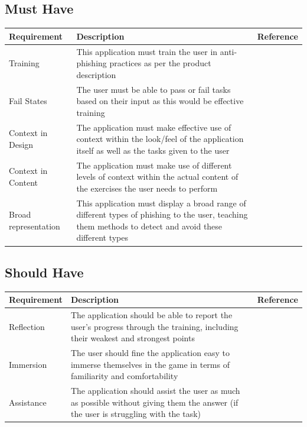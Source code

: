 \documentclass{l4proj}
\begin{document}
\subsection{Must Have}
\begin{tabular}{ | m{10em} | m{25em}| m{5em} | } 
  \hline
  \textbf{Requirement} & \textbf{Description} & \textbf{Reference} \\ 
  \hline
  Training & This application must train the user in anti-phishing practices as per the product description &  \\ 
  \hline
  Fail States & The user must be able to pass or fail tasks based on their input as this would be effective training &  \\ 
  \hline
  Context in Design & The application must make effective use of context within the look/feel of the application itself as well as the tasks given to the user &  \\  
  \hline
  Context in Content & The application must make use of different levels of context within the actual content of the exercises the user needs to perform &  \\  
  \hline
  Broad representation & This application must display a broad range of different types of phishing to the user, teaching them methods to detect and avoid these different types &  \\  
  \hline
\end{tabular}

\subsection{Should Have}
\begin{tabular}{ | m{10em} | m{25em}| m{5em} | } 
  \hline
  \textbf{Requirement} & \textbf{Description} & \textbf{Reference} \\ 
  \hline
  Reflection & The application should be able to report the user’s progress through the training, including their weakest and strongest points &  \\ 
  \hline
  Immersion & The user should fine the application easy to immerse themselves in the game in terms of familiarity and comfortability  &  \\ 
  \hline
  Assistance & The application should assist the user as much as possible without giving them the answer (if the user is struggling with the task) &  \\ 
  \hline
\end{tabular}
\end{document}
